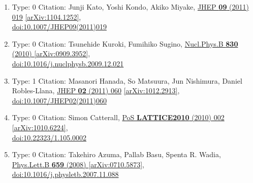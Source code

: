 \documentclass[a4paper,10pt]{article}
\begin{document}
\begin{enumerate}
\begin{enumerate}
  \item Type: 0 Citation: Junji Kato, Yoshi Kondo, Akiko Miyake, \href{https://www.doi.org/10.1007/JHEP09(2011)019}{JHEP {\bf 09} (2011) 019}  \href{https://arxiv.org/abs/1104.1252}{[arXiv:1104.1252]},\\\href{https://www.doi.org/10.1007/JHEP09(2011)019}{doi:10.1007/JHEP09(2011)019}
  \item Type: 0 Citation: Tsunehide Kuroki, Fumihiko Sugino, \href{https://www.doi.org/10.1016/j.nuclphysb.2009.12.021}{Nucl.Phys.B {\bf 830} (2010) }  \href{https://arxiv.org/abs/0909.3952}{[arXiv:0909.3952]},\\\href{https://www.doi.org/10.1016/j.nuclphysb.2009.12.021}{doi:10.1016/j.nuclphysb.2009.12.021}
  \item Type: 1 Citation: Masanori Hanada, So Matsuura, Jun Nishimura, Daniel Robles-Llana, \href{https://www.doi.org/10.1007/JHEP02(2011)060}{JHEP {\bf 02} (2011) 060}  \href{https://arxiv.org/abs/1012.2913}{[arXiv:1012.2913]},\\\href{https://www.doi.org/10.1007/JHEP02(2011)060}{doi:10.1007/JHEP02(2011)060}
  \item Type: 0 Citation: Simon Catterall, \href{https://www.doi.org/10.22323/1.105.0002}{PoS {\bf LATTICE2010} (2010) 002}  \href{https://arxiv.org/abs/1010.6224}{[arXiv:1010.6224]},\\\href{https://www.doi.org/10.22323/1.105.0002}{doi:10.22323/1.105.0002}
  \item Type: 0 Citation: Takehiro Azuma, Pallab Basu, Spenta R. Wadia, \href{https://www.doi.org/10.1016/j.physletb.2007.11.088}{Phys.Lett.B {\bf 659} (2008) }  \href{https://arxiv.org/abs/0710.5873}{[arXiv:0710.5873]},\\\href{https://www.doi.org/10.1016/j.physletb.2007.11.088}{doi:10.1016/j.physletb.2007.11.088}

\end{enumerate}
\end{enumerate}
\end{document}
